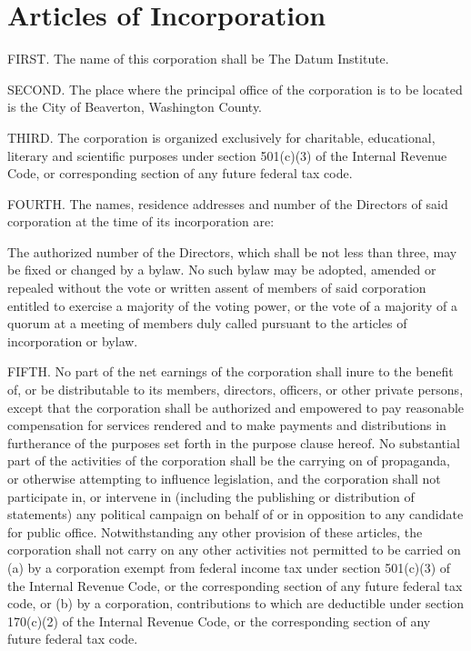 \section{Articles of Incorporation}

FIRST. The name of this corporation shall be The Datum Institute.

SECOND. The place where the principal office of the corporation is to be located is the City of Beaverton, Washington County.

THIRD. The corporation is organized exclusively for charitable, educational, literary and scientific purposes under section 501(c)(3) of the Internal Revenue Code, or corresponding section of any future federal tax code. 

FOURTH. The names, residence addresses and number of the Directors of said corporation at the time of its incorporation are:

The authorized number of the Directors, which shall be not less than three, may be fixed or changed by a bylaw.  No such bylaw may be adopted, amended or repealed without the vote or written assent of members of said corporation entitled to exercise a majority of the voting power, or the vote of a majority of a quorum at a meeting of members duly called pursuant to the articles of incorporation or bylaw.

FIFTH. No part of the net earnings of the corporation shall inure to the benefit of, or be distributable to its members, directors, officers, or other private persons, except that the corporation shall be authorized and empowered to pay reasonable compensation for services rendered and to make payments and distributions in furtherance of the purposes set forth in the purpose clause hereof. No substantial part of the activities of the corporation shall be the carrying on of propaganda, or otherwise attempting to influence legislation, and the corporation shall not participate in, or intervene in (including the publishing or distribution of statements) any political campaign on behalf of or in opposition to any candidate for public office. Notwithstanding any other provision of these articles, the corporation shall not carry on any other activities not permitted to be carried on (a) by a corporation exempt from federal income tax under section 501(c)(3) of the Internal Revenue Code, or the corresponding section of any future federal tax code, or (b) by a corporation, contributions to which are deductible under section 170(c)(2) of the Internal Revenue Code, or the corresponding section of any future federal tax code.

